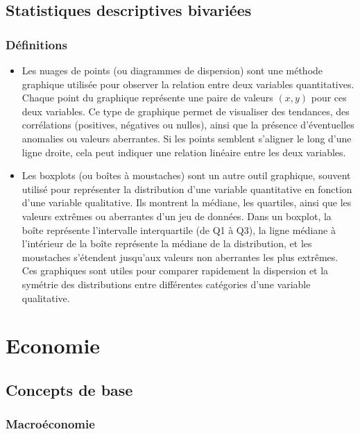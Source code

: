 \documentclass[
  letterpaper,
  DIV=11,
  numbers=noendperiod]{scrartcl}
\begin{document}
\subsection{Statistiques descriptives
bivariées}\label{statistiques-descriptives-bivariuxe9es}

\subsubsection{Définitions}\label{duxe9finitions}

\begin{itemize}
\item
  Les nuages de points (ou diagrammes de dispersion) sont une méthode
  graphique utilisée pour observer la relation entre deux variables
  quantitatives. Chaque point du graphique représente une paire de
  valeurs \((x,y)\) pour ces deux variables. Ce type de graphique permet
  de visualiser des tendances, des corrélations (positives, négatives ou
  nulles), ainsi que la présence d'éventuelles anomalies ou valeurs
  aberrantes. Si les points semblent s'aligner le long d'une ligne
  droite, cela peut indiquer une relation linéaire entre les deux
  variables.
\item
  Les boxplots (ou boîtes à moustaches) sont un autre outil graphique,
  souvent utilisé pour représenter la distribution d'une variable
  quantitative en fonction d'une variable qualitative. Ils montrent la
  médiane, les quartiles, ainsi que les valeurs extrêmes ou aberrantes
  d'un jeu de données. Dans un boxplot, la boîte représente l'intervalle
  interquartile (de Q1 à Q3), la ligne médiane à l'intérieur de la boîte
  représente la médiane de la distribution, et les moustaches s'étendent
  jusqu'aux valeurs non aberrantes les plus extrêmes. Ces graphiques
  sont utiles pour comparer rapidement la dispersion et la symétrie des
  distributions entre différentes catégories d'une variable qualitative.
\end{itemize}

\section{Economie}\label{economie}

\subsection{Concepts de base}\label{concepts-de-base}

\subsubsection{Macroéconomie}\label{macrouxe9conomie}
\end{document}
